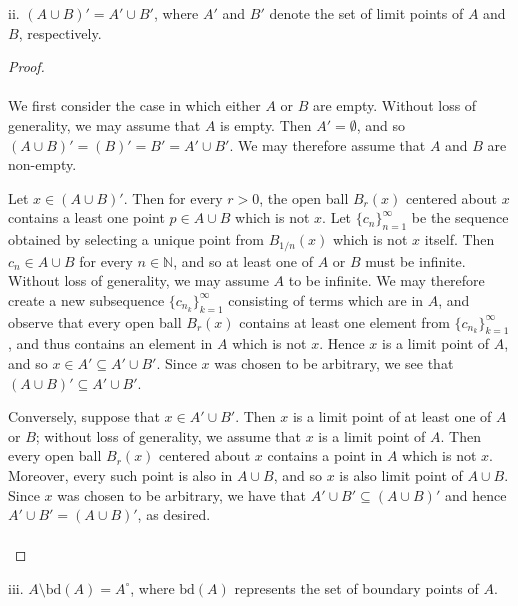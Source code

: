 \pagebreak

ii.  $(A \cup B)' = A' \cup B'$, where $A'$ and $B'$ denote the set of limit points of $A$ and $B$, respectively.\ \\

\begin{proof}\ \\\\
    We first consider the case in which either $A$ or $B$ are empty. Without loss of generality, we may assume that $A$
    is empty. Then $A' = \emptyset$, and so $(A \cup B)' = (B)' = B' = A' \cup B'$. We may therefore assume that $A$ and
    $B$ are non-empty.

    Let $x \in (A \cup B)'$. Then for every $r > 0$, the open ball $B_r(x)$ centered about $x$ contains a least one
    point $p \in A \cup B$ which is not $x$. Let $\{c_n\}_{n=1}^{\infty}$ be the sequence obtained by selecting
    a unique point from $B_{1/n}(x)$ which is not $x$ itself. Then $c_n \in A \cup B$ for every $n \in \mathbb{N}$, and
    so at least one of $A$ or $B$ must be infinite. Without loss of generality, we may assume $A$ to be infinite. We
    may therefore create a new subsequence $\{c_{n_k}\}_{k=1}^{\infty}$ consisting of terms which are in $A$, and 
    observe that every open ball $B_r(x)$ contains at least one element from $\{c_{n_k}\}_{k=1}^{\infty}$, and thus
    contains an element in $A$ which is not $x$. Hence $x$ is a limit point of $A$, and so 
    $x \in A' \subseteq A' \cup B'$. Since $x$ was chosen to be arbitrary, we see that 
    $(A \cup B)' \subseteq A' \cup B'$.

    Conversely, suppose that $x \in A' \cup B'$. Then $x$ is a limit point of at least one of $A$ or $B$; without loss
    of generality, we assume that $x$ is a limit point of $A$. Then every open ball $B_r(x)$ centered about $x$ contains
    a point in $A$ which is not $x$. Moreover, every such point is also in $A \cup B$, and so $x$ is also limit point of 
    $A \cup B$. Since $x$ was chosen to be arbitrary, we have that $A' \cup B' \subseteq (A \cup B)'$ and hence
    $A' \cup B' = (A \cup B)'$, as desired.


    \begin{align*}
    \end{align*}
\end{proof}

\pagebreak

iii. $A \setminus \text{bd}(A) = A^{\circ}$, where $\text{bd}(A)$ represents the set of boundary points of $A$.  \ \\

